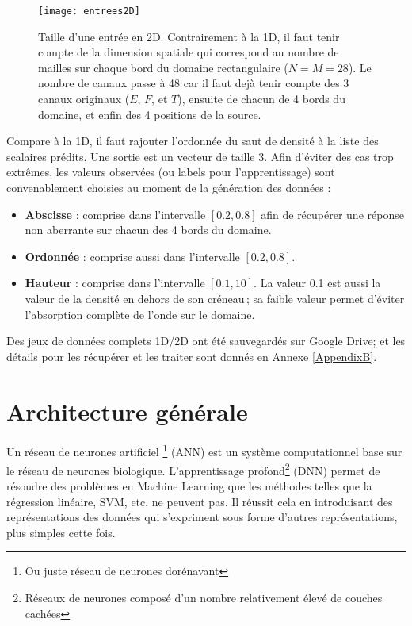 \begin{figure}[!h]
  \centering
  \texttt{[image: entrees2D]} 
  \decoRule
  \caption[entrees2D]{Taille d'une entrée en 2D. Contrairement à la 1D, il faut tenir compte de la dimension spatiale qui correspond au nombre de mailles sur chaque bord du domaine rectangulaire ($N=M=28$). Le nombre de canaux passe à 48 car il faut dejà tenir compte des 3 canaux originaux ($E$, $F$, et $T$), ensuite de chacun de 4 bords du domaine, et enfin des 4 positions de la source.}
  \label{fig:entrees2D}
\end{figure}

Compare à la 1D, il faut rajouter l'ordonnée du saut de densité à la liste des scalaires prédits. Une sortie est un vecteur de taille 3. Afin d'éviter des cas trop extrêmes, les valeurs observées (ou labels pour l'apprentissage) sont convenablement choisies au moment de la génération des données :
\begin{itemize}
 \item \textbf{Abscisse} : comprise dans l'intervalle $[0.2,0.8]$ afin de récupérer une réponse non aberrante sur chacun des 4 bords du domaine.
 \item \textbf{Ordonnée} : comprise aussi dans l'intervalle $[0.2,0.8]$.
 \item \textbf{Hauteur} : comprise dans l'intervalle $[0.1,10]$. La valeur 0.1 est aussi la valeur de la densité en dehors de son créneau ; sa faible valeur permet d'éviter l'absorption complète de l'onde sur le domaine.
\end{itemize}

Des jeux de données complets 1D/2D ont été sauvegardés sur Google Drive; et les détails pour les récupérer et les traiter sont donnés en Annexe \ref{AppendixB}.


\section{Architecture générale}

Un réseau de neurones artificiel \footnote{Ou juste réseau de neurones dorénavant} (ANN) est un système computationnel base sur le réseau de neurones biologique. L'apprentissage profond\footnote{Réseaux de neurones composé d'un nombre relativement élevé de couches cachées} (DNN) permet de résoudre des problèmes en Machine Learning que les méthodes telles que la régression linéaire, SVM, etc. ne peuvent pas. Il réussit cela en introduisant des représentations des données qui s'expriment sous forme d'autres représentations, plus simples cette fois. 

